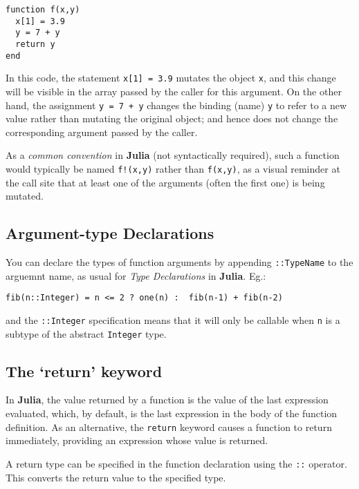 \documentclass[
]{article}
\begin{document}
\begin{verbatim}
function f(x,y)
  x[1] = 3.9
  y = 7 + y
  return y
end
\end{verbatim}

In this code, the statement \texttt{x{[}1{]}\ =\ 3.9} mutates the object
\texttt{x}, and this change will be visible in the array passed by the
caller for this argument. On the other hand, the assignment
\texttt{y\ =\ 7\ +\ y} changes the binding (name) \texttt{y} to refer to
a new value rather than mutating the original object; and hence does not
change the corresponding argument passed by the caller.

As a \emph{common convention} in \textbf{Julia} (not syntactically
required), such a function would typically be named \texttt{f!(x,y)}
rather than \texttt{f(x,y)}, as a visual reminder at the call site that
at least one of the arguments (often the first one) is being mutated.

\hypertarget{argument-type-declarations}{%
\subsection{Argument-type
Declarations}\label{argument-type-declarations}}

You can declare the types of function arguments by appending
\texttt{::TypeName} to the arguemnt name, as usual for \emph{Type
Declarations} in \textbf{Julia}. Eg.:

\begin{verbatim}
fib(n::Integer) = n <= 2 ? one(n) :  fib(n-1) + fib(n-2)
\end{verbatim}

and the \texttt{::Integer} specification means that it will only be
callable when \texttt{n} is a subtype of the abstract \texttt{Integer}
type.

\hypertarget{the-return-keyword}{%
\subsection{The `return' keyword}\label{the-return-keyword}}

In \textbf{Julia}, the value returned by a function is the value of the
last expression evaluated, which, by default, is the last expression in
the body of the function definition. As an alternative, the
\texttt{return} keyword causes a function to return immediately,
providing an expression whose value is returned.

A return type can be specified in the function declaration using the
\texttt{::} operator. This converts the return value to the specified
type.
\end{document}
